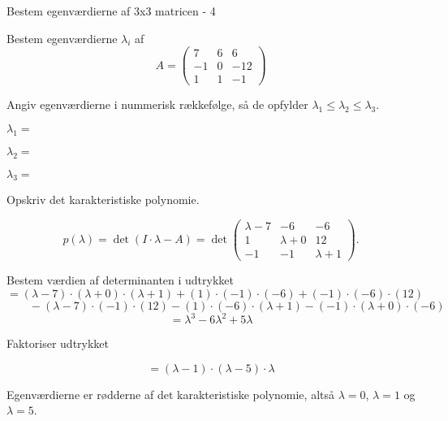 \documentclass{article}
\begin{document}
\begin{exercise}{Bestem egenværdierne af 3x3 matricen - 4}

Bestem egenværdierne $\lambda_i$ af 
\[
A=\begin{pmatrix}
7 & 6 & 6 \\
-1 & 0 & -12 \\
1 & 1 & -1
\end{pmatrix}
\]

Angiv egenværdierne i nummerisk rækkefølge, så de
opfylder $\lambda_1 \le \lambda_2 \le \lambda_3$.

$\lambda_1 = $ 

$\lambda_2 = $ 

$\lambda_3 = $ 

\hint
Opskriv det karakteristiske polynomie.

\hint
\[
p(\lambda)=\det\left(I \cdot \lambda - A \right)=\det\begin{pmatrix}
\lambda - 7 & -6 & -6 \\
1 & \lambda + 0 & 12 \\
-1 & -1 & \lambda + 1
\end{pmatrix}.
\]

\hint
Bestem værdien af determinanten i udtrykket
\[
=(\lambda-7) \cdot (\lambda+0) \cdot (\lambda+1)+(1) \cdot (-1) \cdot (-6)+(-1) \cdot (-6) \cdot (12)
\]
\[
\qquad-(\lambda-7) \cdot (-1) \cdot (12)-(1) \cdot (-6) \cdot (\lambda+1)-(-1) \cdot (\lambda+0) \cdot (-6)
\]
\[
=\lambda^3-6\lambda^2+5\lambda
\]

\hint
Faktoriser udtrykket

\hint
\[
=(\lambda-1) \cdot (\lambda-5) \cdot \lambda
\]

\hint
Egenværdierne er rødderne af det karakteristiske polynomie, 
altså
$\lambda=0$, $\lambda=1$ og $\lambda=5$.

\end{exercise}
\end{document}
